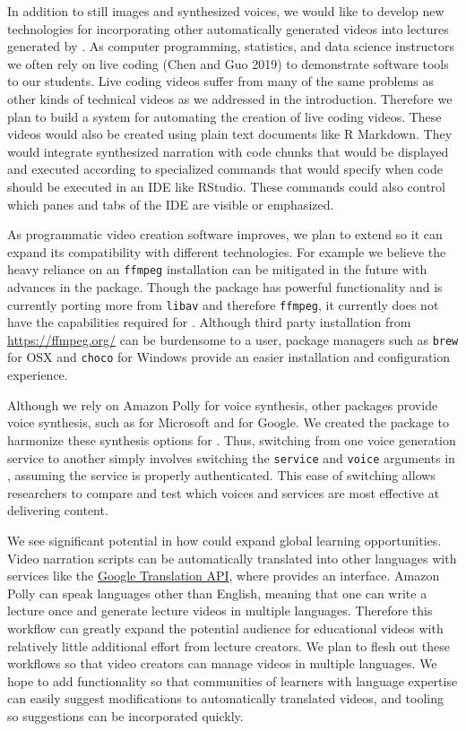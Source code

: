 In addition to still images and synthesized voices, we would like to
develop new technologies for incorporating other automatically generated
videos into lectures generated by . As computer programming,
statistics, and data science instructors we often rely on live coding
(Chen and Guo 2019) to demonstrate software tools to our students. Live
coding videos suffer from many of the same problems as other kinds of
technical videos as we addressed in the introduction. Therefore we plan
to build a system for automating the creation of live coding videos.
These videos would also be created using plain text documents like R
Markdown. They would integrate synthesized narration with code chunks
that would be displayed and executed according to specialized commands
that would specify when code should be executed in an IDE like RStudio.
These commands could also control which panes and tabs of the IDE are
visible or emphasized.

As programmatic video creation software improves, we plan to extend
 so it can expand its compatibility with different
technologies. For example we believe the heavy reliance on an
\texttt{ffmpeg} installation can be mitigated in the future with
advances in the  package. Though the  package has
powerful functionality and is currently porting more from \texttt{libav}
and therefore \texttt{ffmpeg}, it currently does not have the
capabilities required for . Although third party installation
from \url{https://ffmpeg.org/} can be burdensome to a user, package
managers such as \texttt{brew} for OSX and \texttt{choco} for Windows
provide an easier installation and configuration experience.

Although we rely on Amazon Polly for voice synthesis, other packages
provide voice synthesis, such as  for Microsoft and
 for Google. We created the 
package to harmonize these synthesis options for . Thus,
switching from one voice generation service to another simply involves
switching the \texttt{service} and \texttt{voice} arguments in
, assuming the service is properly authenticated. This ease of
switching allows researchers to compare and test which voices and
services are most effective at delivering content.

We see significant potential in how  could expand global
learning opportunities. Video narration scripts can be automatically
translated into other languages with services like the
\href{https://cloud.google.com/translate/docs/}{Google Translation API},
where  provides an interface. Amazon Polly can
speak languages other than English, meaning that one can write a lecture
once and generate lecture videos in multiple languages. Therefore this
workflow can greatly expand the potential audience for educational
videos with relatively little additional effort from lecture creators.
We plan to flesh out these workflows so that video creators can manage
videos in multiple languages. We hope to add functionality so that
communities of learners with language expertise can easily suggest
modifications to automatically translated videos, and tooling so
suggestions can be incorporated quickly.

